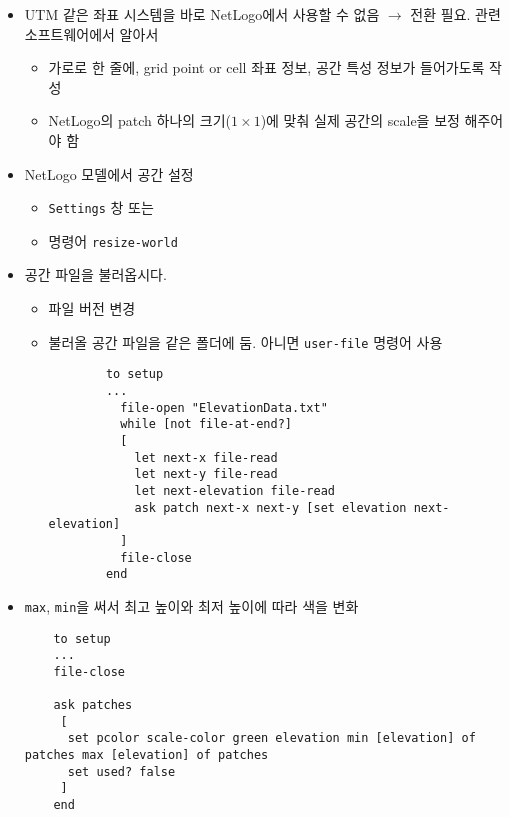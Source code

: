 \documentclass[hyperref={unicode}]{beamer}
\begin{document}
\begin{frame}[fragile]
\begin{itemize}
\item UTM 같은 좌표 시스템을 바로 NetLogo에서 사용할 수 없음 $\rightarrow$ 전환 필요. 관련 소프트웨어에서 알아서
	\begin{itemize}
	\item 가로로 한 줄에, grid point or cell 좌표 정보, 공간 특성 정보가 들어가도록 작성
	\item NetLogo의 patch 하나의 크기($1 \times 1$)에 맞춰 실제 공간의 scale을 보정 해주어야 함
	\end{itemize}
\item NetLogo 모델에서 공간 설정
	\begin{itemize}
	\item \verb|Settings| 창 또는
	\item 명령어 \verb|resize-world|
	\end{itemize}	
\end{itemize}	
\end{frame}

\begin{frame}[fragile]
\begin{itemize}
\item 공간 파일을 불러옵시다.
	\begin{itemize}
	\item 파일 버전 변경
	\item 불러올 공간 파일을 같은 폴더에 둠. 아니면 \verb|user-file| 명령어 사용
		\begin{verbatim}
		to setup
		...
		  file-open "ElevationData.txt"
		  while [not file-at-end?]
		  [
		    let next-x file-read
		    let next-y file-read
		    let next-elevation file-read
		    ask patch next-x next-y [set elevation next-elevation]
		  ]
		  file-close
		end
		\end{verbatim}
	\end{itemize}		
\end{itemize}	
\end{frame}

\begin{frame}[fragile]
\begin{itemize}
\item \verb|max|, \verb|min|을 써서 최고 높이와 최저 높이에 따라 색을 변화
	\begin{verbatim}
	to setup
	...
	file-close
		
	ask patches
	 [  
	  set pcolor scale-color green elevation min [elevation] of patches max [elevation] of patches
	  set used? false
	 ]
	end
	\end{verbatim}
\end{itemize}	
\end{frame}
\end{document}
